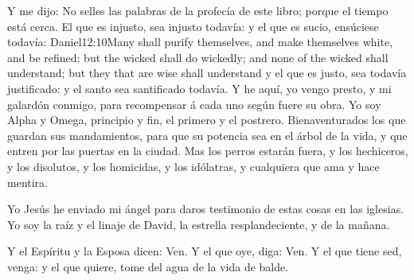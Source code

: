 Y me dijo: No selles las palabras de la profecía de este libro; porque el tiempo está cerca. 
El que es injusto, sea injusto todavía: y el que es sucio, ensúciese todavía:%
					{Daniel}{12:10}{Many shall purify themselves, and make themselves white, and be refined; but the wicked shall do wickedly; and none of the wicked shall understand; but they that are wise shall understand} %
 y el que es justo, sea todavía justificado: y el santo sea santificado todavía.%
Y he aquí, yo vengo presto, y mi galardón conmigo, para recompensar á cada uno según fuere su obra. 
Yo soy Alpha y Omega, principio y fin, el primero y el postrero. 
Bienaventurados los que guardan sus mandamientos, para que su potencia sea en el árbol de la vida, y que entren por las puertas en la ciudad.%
Mas los perros estarán fuera, y los hechiceros, y los disolutos, y los homicidas, y los idólatras, y cualquiera que ama y hace mentira.

Yo Jesús he enviado mi ángel%
 para daros testimonio de estas cosas en las iglesias. Yo soy la raíz y el linaje de David, la estrella resplandeciente, y de la mañana.%

Y el Espíritu y la Esposa dicen: Ven. Y el que oye, diga: Ven. Y el que tiene sed, venga: y el que quiere, tome del agua de la vida de balde.%

